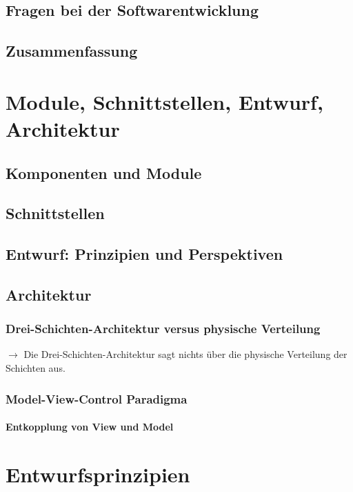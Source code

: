 \documentclass{scrreprt}
\begin{document}
\section{Fragen bei der Softwarentwicklung}
\section{Zusammenfassung}

\chapter{Module, Schnittstellen, Entwurf, Architektur}
\section{Komponenten und Module}

\section{Schnittstellen}

\section{Entwurf: Prinzipien und Perspektiven}

\section{Architektur}
\subsection{Drei-Schichten-Architektur versus physische Verteilung}
$\to$ Die Drei-Schichten-Architektur sagt nichts über die physische Verteilung der Schichten aus.
\subsection{Model-View-Control Paradigma}
\subsubsection*{Entkopplung von View und Model}

\chapter{Entwurfsprinzipien}
\end{document}
